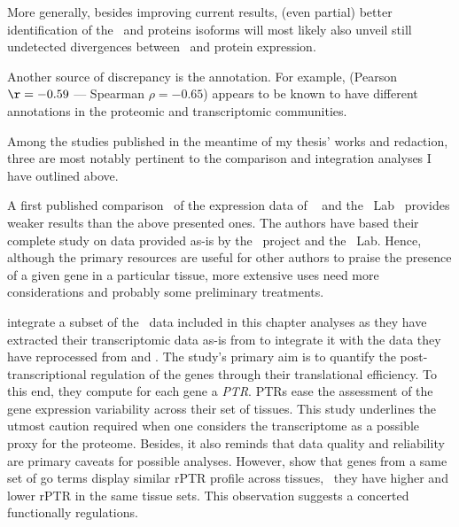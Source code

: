 More generally,
besides improving current results,
(even partial) better identification of the \mRNAs\ and proteins isoforms
will most likely also unveil still undetected divergences
between \mRNA\ and protein expression.\mybr\

Another source of discrepancy is the annotation.
For example,  (Pearson $\r=-0.59$  --- Spearman $\rho=-0.65$)
appears to be known to have different annotations
in the proteomic and transcriptomic communities.

Among the studies published in the meantime of my thesis' works and redaction,
three are most notably pertinent to the comparison and integration analyses
I have outlined above.

A first published comparison~ of the expression data of
\gtex\  and the \pandey\ Lab~
provides weaker results than the above presented ones.
The authors have based their complete study on data provided as-is
by the \gtex\ project and the \pandey\ Lab.
Hence, although the primary resources are useful
for other authors to praise the presence of a given gene in a particular tissue,
more extensive uses need more considerations
and probably some preliminary treatments.

\citet{Franks2017-bp} integrate a subset of the \uhlen\ data included
in this chapter analyses
as they have extracted their transcriptomic data as-is from \citet{Uhlen2014}
to integrate it with the data they have reprocessed
from \citet{PandeyData} and \citet{KusterData}.
The study's primary aim is
to quantify the post-transcriptional regulation of the genes
through their translational efficiency.
To this end, they compute for each gene a \emph{\gls{PTR}}.
\glspl{PTR} ease the assessment of the gene expression variability
across their set of tissues.
This study underlines the utmost caution required
when one considers the transcriptome as a possible proxy for the proteome.
Besides, it also reminds that data quality and reliability are primary caveats
for possible analyses.
However, \citet{Franks2017-bp} show that genes from a same set of \gls{go} terms
display similar \gls{rPTR} profile across tissues,
\ie\ they have higher and lower \gls{rPTR} in the same tissue sets.
This observation suggests a concerted functionally regulations.

